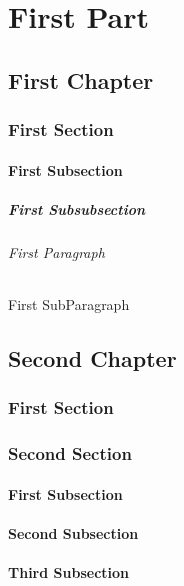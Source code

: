 \documentclass{report}
\begin{document}
\part{First Part}
\chapter{First Chapter}
\section{First Section}
\subsection{First Subsection}
\subsubsection{First Subsubsection}
\paragraph{First Paragraph}
\subparagraph{First SubParagraph}
\chapter{Second Chapter}
\section{First Section}
\section{Second Section}
\subsection{First Subsection}
\subsection{Second Subsection}
\subsection{Third Subsection}
\end{document}
